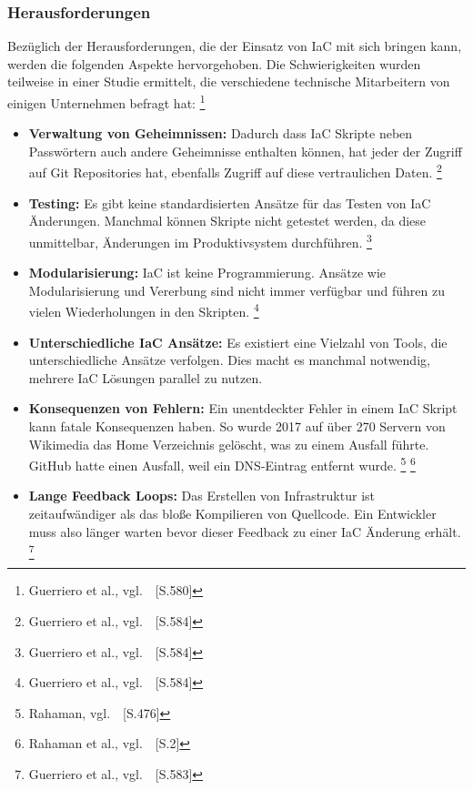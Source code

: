 \subsubsection{Herausforderungen}\label{iac_probleme}

Bezüglich der Herausforderungen, die der Einsatz von IaC mit sich bringen kann, werden die folgenden Aspekte hervorgehoben.
Die Schwierigkeiten wurden teilweise in einer Studie ermittelt, die verschiedene technische Mitarbeitern von einigen Unternehmen befragt hat:
\footnote{Guerriero et al., vgl.~\cite{Guerriero2019}~[S.580]}

\begin{itemize}
    \item \textbf{Verwaltung von Geheimnissen:}
    Dadurch dass IaC Skripte neben Passwörtern auch andere Geheimnisse enthalten können, hat jeder der Zugriff auf Git Repositories hat, ebenfalls Zugriff auf diese vertraulichen Daten.
    \footnote{Guerriero et al., vgl.~\cite{Guerriero2019}~[S.584]}

    \item \textbf{Testing:}
    Es gibt keine standardisierten Ansätze für das Testen von IaC Änderungen.
    Manchmal können Skripte nicht getestet werden, da diese unmittelbar, Änderungen im Produktivsystem durchführen.
    \footnote{Guerriero et al., vgl.~\cite{Guerriero2019}~[S.584]}

    \item \textbf{Modularisierung:}
    IaC ist keine Programmierung.
    Ansätze wie Modularisierung und Vererbung sind nicht immer verfügbar und führen zu vielen Wiederholungen in den Skripten.
    \footnote{Guerriero et al., vgl.~\cite{Guerriero2019}~[S.584]}

    \item \textbf{Unterschiedliche IaC Ansätze:}
    Es existiert eine Vielzahl von Tools, die unterschiedliche Ansätze verfolgen.
    Dies macht es manchmal notwendig, mehrere IaC Lösungen parallel zu nutzen.

    \item \textbf{Konsequenzen von Fehlern:}
    Ein unentdeckter Fehler in einem IaC Skript kann fatale Konsequenzen haben.
    So wurde 2017 auf über 270 Servern von Wikimedia das Home Verzeichnis gelöscht, was zu einem Ausfall führte.
    GitHub hatte einen Ausfall, weil ein DNS-Eintrag entfernt wurde. \footnote{Rahaman, vgl.~\cite{Rahman2018b}~[S.476]}
    \footnote{Rahaman et al., vgl.~\cite{Rahman2018}~[S.2]}

    \item \textbf{Lange Feedback Loops:}
    Das Erstellen von Infrastruktur ist zeitaufwändiger als das bloße Kompilieren von Quellcode.
    Ein Entwickler muss also länger warten bevor dieser Feedback zu einer IaC Änderung erhält.
    \footnote{Guerriero et al., vgl.~\cite{Guerriero2019}~[S.583]}

\end{itemize}

